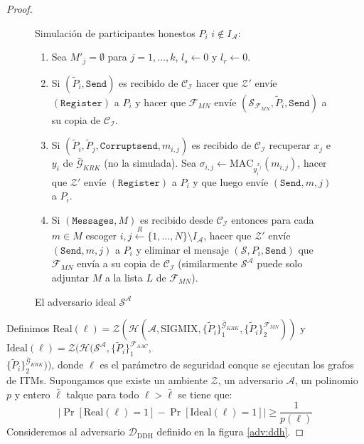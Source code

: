\begin{proof}
\begin{figure}
{\begin{minipage}[t]{1\columnwidth}
Simulación de participantes honestos $P_i$ $i \notin I_\mathcal{A}$:
\begin{enumerate}
    \item Sea $M'_j = \emptyset$ para $j = 1, \ldots, k$, $l_s \leftarrow 0$ y $l_r \leftarrow 0$.
    \item Si $(\tilde{P}_i, \mathtt{Send})$ es recibido de $\mathcal{C_I}$
          hacer que $\mathcal{Z}'$ envíe $(\mathtt{Register})$ a $P_i$ y hacer que $\mathcal{F}_{MN}$ envíe
          $(\mathcal{S}_{\mathcal{F}_{MN}}, \tilde{P}_i, \mathtt{Send})$ a su copia de $\mathcal{C_I}$.
    \item Si $(\tilde{P}_i, \tilde{P}_j, \mathtt{Corruptsend}, m_{i,j})$ es
          recibido de $\mathcal{C_I}$ recuperar $x_j$ e $y_i$ de
          $\bar{\mathcal{G}}_{KRK}$ (no la simulada). Sea $\sigma_{i,j} \leftarrow
          \mathrm{MAC}_{y_i^{x_j}}(m_{i,j})$,
          hacer que $\mathcal{Z}'$ envíe $(\mathtt{Register})$ a $P_i$ y que luego envíe $(\mathtt{Send}, m, j)$ a
          $P_i$.
    \item Si $(\mathtt{Messages}, M)$ es recibido desde $\mathcal{C_I}$ entonces para cada $m \in M$
          escoger $i,j \overset{R}{\leftarrow} \{1, \ldots, N\} \setminus I_\mathcal{A}$, hacer que $\mathcal{Z}'$
          envíe $(\mathtt{Send}, m, j)$ a $P_i$ y eliminar el mensaje $(\mathcal{S}, P_i, \mathtt{Send})$ que
          $\mathcal{F}_{MN}$ envía a su copia de $\mathcal{C_I}$ (similarmente $\mathcal{S^A}$ puede solo adjuntar
          $M$ a la lista $L$ de $\mathcal{F}_{MN}$).
\end{enumerate}
\end{minipage}}
\caption{El adversario ideal $\mathcal{S^A}$}
\label{adv_S_A}
\end{figure}

Definimos
$\mathrm{Real(\ell)} = \mathcal{Z}(
                    \mathcal{H}(
                        \mathcal{A},
                        \mathrm{SIGMIX},
                        \{\tilde{P}_i\}_1^{\bar{\mathcal{G}}_{KRK}},
                        \{\tilde{P}_i\}_2^{\mathcal{F}_{MN}}))$
y
$\mathrm{Ideal(\ell)} = \mathcal{Z}(
                    \mathcal{H}(
                        \mathcal{S^A},
                        \{\tilde{P}_i\}_1^{\mathcal{F}_{AAC}},$\\$
                        \{\tilde{P}_i\}_2^{\bar{\mathcal{G}}_{KRK}}))$, donde $\ell$ es el parámetro de seguridad
conque se ejecutan los grafos de ITMs.
Supongamos que existe un ambiente $\mathcal{Z}$, un adversario $\mathcal{A}$, un polinomio $p$ y entero
$\bar{\ell}$ talque para todo $\ell >  \bar{\ell}$ se tiene que:
\begin{equation}
\left|
    \Pr[\mathrm{Real(\ell)} = 1]
    - \Pr[\mathrm{Ideal(\ell)} = 1]
\right| \geq \frac{1}{p(\ell)}
\label{eq:guc}
\end{equation}
Consideremos al adversario $\mathcal{D}_\textrm{DDH}$ definido en la figura \ref{adv:ddh}.


\end{proof}
